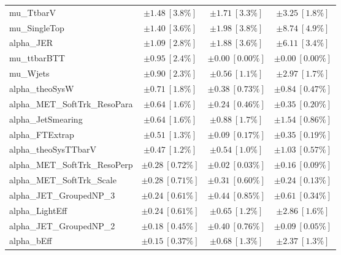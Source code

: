 \begin{table}
\begin{center}
\begin{tabular*}{\textwidth}{@{\extracolsep{\fill}}lccc}
mu\_TtbarV         & $\pm 1.48\ [3.8\%] $          & $\pm 1.71\ [3.3\%] $          & $\pm 3.25\ [1.8\%] $       \\
mu\_SingleTop         & $\pm 1.40\ [3.6\%] $          & $\pm 1.98\ [3.8\%] $          & $\pm 8.74\ [4.9\%] $       \\
alpha\_JER         & $\pm 1.09\ [2.8\%] $          & $\pm 1.88\ [3.6\%] $          & $\pm 6.11\ [3.4\%] $       \\
mu\_ttbarBTT         & $\pm 0.95\ [2.4\%] $          & $\pm 0.00\ [0.00\%] $          & $\pm 0.00\ [0.00\%] $       \\
mu\_Wjets         & $\pm 0.90\ [2.3\%] $          & $\pm 0.56\ [1.1\%] $          & $\pm 2.97\ [1.7\%] $       \\
alpha\_theoSysW         & $\pm 0.71\ [1.8\%] $          & $\pm 0.38\ [0.73\%] $          & $\pm 0.84\ [0.47\%] $       \\
alpha\_MET\_SoftTrk\_ResoPara         & $\pm 0.64\ [1.6\%] $          & $\pm 0.24\ [0.46\%] $          & $\pm 0.35\ [0.20\%] $       \\
alpha\_JetSmearing         & $\pm 0.64\ [1.6\%] $          & $\pm 0.88\ [1.7\%] $          & $\pm 1.54\ [0.86\%] $       \\
alpha\_FTExtrap         & $\pm 0.51\ [1.3\%] $          & $\pm 0.09\ [0.17\%] $          & $\pm 0.35\ [0.19\%] $       \\
alpha\_theoSysTTbarV         & $\pm 0.47\ [1.2\%] $          & $\pm 0.54\ [1.0\%] $          & $\pm 1.03\ [0.57\%] $       \\
alpha\_MET\_SoftTrk\_ResoPerp         & $\pm 0.28\ [0.72\%] $          & $\pm 0.02\ [0.03\%] $          & $\pm 0.16\ [0.09\%] $       \\
alpha\_MET\_SoftTrk\_Scale         & $\pm 0.28\ [0.71\%] $          & $\pm 0.31\ [0.60\%] $          & $\pm 0.24\ [0.13\%] $       \\
alpha\_JET\_GroupedNP\_3         & $\pm 0.24\ [0.61\%] $          & $\pm 0.44\ [0.85\%] $          & $\pm 0.61\ [0.34\%] $       \\
alpha\_LightEff         & $\pm 0.24\ [0.61\%] $          & $\pm 0.65\ [1.2\%] $          & $\pm 2.86\ [1.6\%] $       \\
alpha\_JET\_GroupedNP\_2         & $\pm 0.18\ [0.45\%] $          & $\pm 0.40\ [0.76\%] $          & $\pm 0.09\ [0.05\%] $       \\
alpha\_bEff         & $\pm 0.15\ [0.37\%] $          & $\pm 0.68\ [1.3\%] $          & $\pm 2.37\ [1.3\%] $       \\

\end{tabular*}
\end{center}
\end{table}
